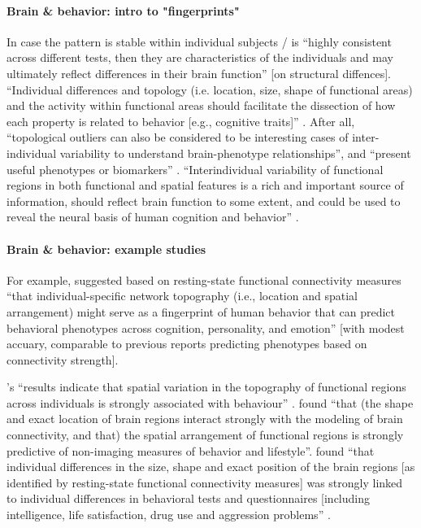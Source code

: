 \paragraph{Brain \& behavior: intro to "fingerprints"}


In case the pattern is stable within individual subjects / is ``highly
consistent across different tests, then they are characteristics of the
individuals and may ultimately reflect differences in their brain function''
\citep{kanai2011structural} [on structural diffences].
%
``Individual differences and topology (i.e. location, size, shape of functional
areas) and the activity within functional areas should facilitate the dissection
of how each property is related to behavior [e.g., cognitive traits]''
\citep{glasser2016multi}.
After all, ``topological outliers can also be considered to be interesting cases
of inter-individual variability to understand brain-phenotype relationships'',
and ``present useful phenotypes or biomarkers'' \citep{vanhorn2008individual}.
%
``Interindividual variability of functional regions in both functional and
spatial features is a rich and important source of information, should reflect
brain function to some extent, and could be used to reveal the neural basis of
human cognition and behavior'' \citep{zhen2015quantifying}.


\paragraph{Brain \& behavior: example studies}


%
For example, \citet{kong2019spatial} suggested based on resting-state functional
connectivity measures ``that individual-specific network topography (i.e.,
location and spatial arrangement) might serve as a fingerprint of human behavior
that can predict behavioral phenotypes across cognition, personality, and
emotion'' \citep{kong2019spatial} [with modest accuary, comparable to previous
reports predicting phenotypes based on connectivity strength].

%
\citep{bijsterbosch2018relationship}'s ``results indicate that spatial variation
in the topography of functional regions across individuals is strongly
associated with behaviour'' \citep{bijsterbosch2018relationship}.
%
\citet{bijsterbosch2018relationship} found ``that (the shape and exact location
of brain regions interact strongly with the modeling of brain connectivity, and
that) the spatial arrangement of functional regions is strongly predictive of
non-imaging measures of behavior and lifestyle''.
%
\citet{bijsterbosch2018relationship} found ``that individual differences in the
size, shape and exact position of the brain regions [as identified by
resting-state functional connectivity measures] was strongly linked to
individual differences in behavioral tests and questionnaires [including
intelligence, life satisfaction, drug use and aggression problems''
\citep{bijsterbosch2018relationship}.

